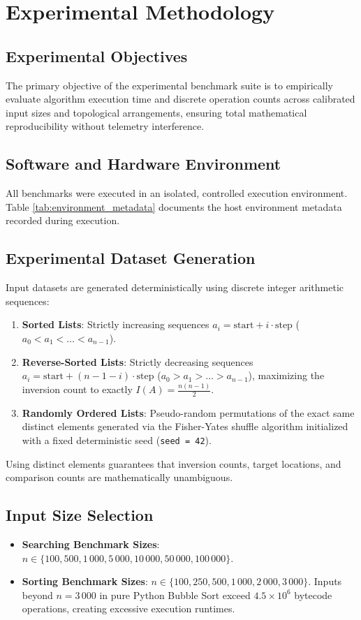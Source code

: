 \chapter{Experimental Methodology}
\label{chap:methodology}

\section{Experimental Objectives}
The primary objective of the experimental benchmark suite is to empirically evaluate algorithm execution time and discrete operation counts across calibrated input sizes and topological arrangements, ensuring total mathematical reproducibility without telemetry interference.

\section{Software and Hardware Environment}
All benchmarks were executed in an isolated, controlled execution environment. Table \ref{tab:environment_metadata} documents the host environment metadata recorded during execution.



\section{Experimental Dataset Generation}
Input datasets are generated deterministically using discrete integer arithmetic sequences:
\begin{enumerate}
    \item \textbf{Sorted Lists}: Strictly increasing sequences $a_i = \text{start} + i \cdot \text{step}$ ($a_0 < a_1 < \dots < a_{n-1}$).
    \item \textbf{Reverse-Sorted Lists}: Strictly decreasing sequences $a_i = \text{start} + (n - 1 - i) \cdot \text{step}$ ($a_0 > a_1 > \dots > a_{n-1}$), maximizing the inversion count to exactly $I(A) = \frac{n(n-1)}{2}$.
    \item \textbf{Randomly Ordered Lists}: Pseudo-random permutations of the exact same distinct elements generated via the Fisher-Yates shuffle algorithm initialized with a fixed deterministic seed (\texttt{seed = 42}).
\end{enumerate}
Using distinct elements guarantees that inversion counts, target locations, and comparison counts are mathematically unambiguous.

\section{Input Size Selection}
\begin{itemize}
    \item \textbf{Searching Benchmark Sizes}: $n \in \{100, 500, 1\,000, 5\,000, 10\,000, 50\,000, 100\,000\}$.
    \item \textbf{Sorting Benchmark Sizes}: $n \in \{100, 250, 500, 1\,000, 2\,000, 3\,000\}$. Inputs beyond $n = 3\,000$ in pure Python Bubble Sort exceed $4.5 \times 10^6$ bytecode operations, creating excessive execution runtimes.
\end{itemize}

